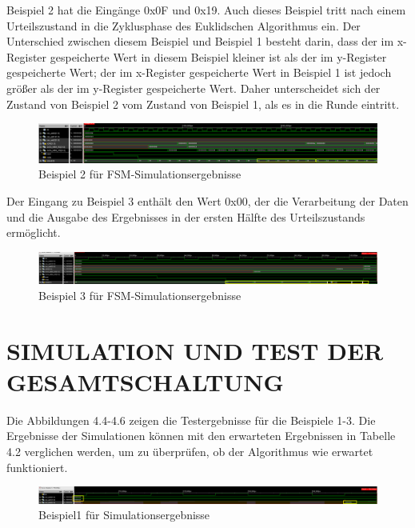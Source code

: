 \noindent Beispiel 2 hat die Eingänge 0x0F und 0x19. Auch dieses Beispiel tritt nach einem Urteilszustand in die Zyklusphase des Euklidschen Algorithmus ein. Der Unterschied zwischen diesem Beispiel und Beispiel 1 besteht darin, dass der im x-Register gespeicherte Wert in diesem Beispiel kleiner ist als der im y-Register gespeicherte Wert; der im x-Register gespeicherte Wert in Beispiel 1 ist jedoch größer als der im y-Register gespeicherte Wert. Daher unterscheidet sich der Zustand von Beispiel 2 vom Zustand von Beispiel 1, als es in die Runde eintritt.

\begin{figure}[H]
    \centering
    \includegraphics[width=1.0\textwidth]{images/bs2.png}
    \caption[Beispiel 2 für FSM-Simulationsergebnisse]{Beispiel 2 für FSM-Simulationsergebnisse}
    \label{fig:bs2}
\end{figure}

\noindent Der Eingang zu Beispiel 3 enthält den Wert 0x00, der die Verarbeitung der Daten und die Ausgabe des Ergebnisses in der ersten Hälfte des Urteilszustands ermöglicht.

\begin{figure}[H]
    \centering
    \includegraphics[width=1.0\textwidth]{images/bs3.png}
    \caption[Beispiel 3 für FSM-Simulationsergebnisse]{Beispiel 3 für FSM-Simulationsergebnisse}
    \label{fig:bs3}
\end{figure}

\section{SIMULATION UND TEST DER GESAMTSCHALTUNG}

Die Abbildungen 4.4-4.6 zeigen die Testergebnisse für die Beispiele 1-3. Die Ergebnisse der Simulationen können mit den erwarteten Ergebnissen in Tabelle 4.2 verglichen werden, um zu überprüfen, ob der Algorithmus wie erwartet funktioniert.

\begin{figure}[H]
    \centering
    \includegraphics[width=1.0\textwidth]{images/bs1result.png}
    \caption[Beispiel1 für Simulationsergebnisse]{Beispiel1 für Simulationsergebnisse}
    \label{fig:bs1result}
\end{figure}

